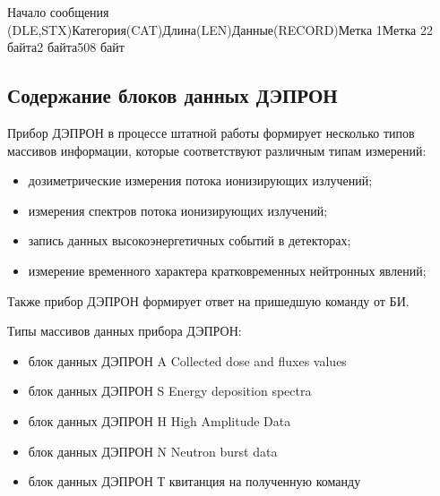 \documentclass[a4paper,portrait,12pt]{article}
\begin{document}
{{{{{\small Начало сообщения (DLE,STX)Категория(CAT)Длина(LEN)Данные(RECORD)Метка 1Метка 22 байта2 байта508 байт}


\newpage



	


	


	


	


	


\subsection*{	\textbf{Содержание блоков данных ДЭПРОН}}

Прибор ДЭПРОН в процессе штатной работы формирует несколько типов массивов информации, которые соответствуют различным типам измерений:


\begin{itemize}
\item 	дозиметрические измерения потока ионизирующих излучений;


\item 	измерения спектров потока ионизирующих излучений;


\item 	запись данных высокоэнергетичных событий в детекторах;


\item 	измерение временного характера кратковременных нейтронных явлений;


\end{itemize}
Также прибор ДЭПРОН формирует ответ на пришедшую команду от БИ.





Типы массивов данных прибора ДЭПРОН:


\begin{itemize}
\item 	блок данных ДЭПРОН  A  		Collected dose and fluxes values


\item 	блок данных ДЭПРОН  S 		Energy deposition spectra


\item 	блок данных ДЭПРОН  H  		High Amplitude Data


\item 	блок данных ДЭПРОН  N		Neutron burst data


\item 	блок данных ДЭПРОН  Т		квитанция на полученную команду



\end{itemize}}}}}
\end{document}
